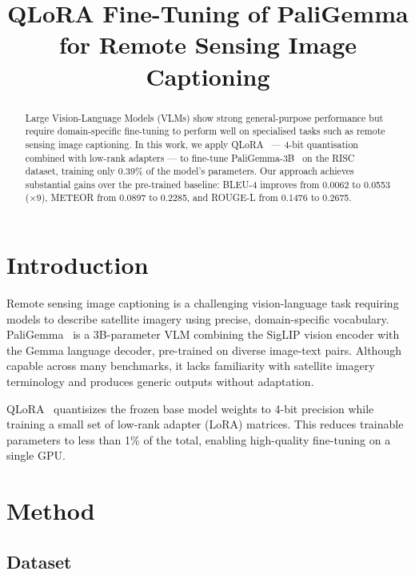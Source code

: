 \documentclass[conference]{IEEEtran}
\begin{document}
\title{QLoRA Fine-Tuning of PaliGemma for Remote Sensing Image Captioning}

\author{
}
\maketitle

\begin{abstract}
Large Vision-Language Models (VLMs) show strong general-purpose performance but require
domain-specific fine-tuning to perform well on specialised tasks such as remote sensing image captioning.
In this work, we apply QLoRA~\cite{dettmers2023qlora} --- 4-bit quantisation combined with
low-rank adapters --- to fine-tune PaliGemma-3B~\cite{beyer2024paligemma} on the RISC dataset,
training only 0.39\% of the model's parameters.
Our approach achieves substantial gains over the pre-trained baseline:
BLEU-4 improves from 0.0062 to 0.0553 ($\times$9), METEOR from 0.0897 to 0.2285,
and ROUGE-L from 0.1476 to 0.2675.
\end{abstract}

\section{Introduction}

Remote sensing image captioning is a challenging vision-language task requiring models to
describe satellite imagery using precise, domain-specific vocabulary.
PaliGemma~\cite{beyer2024paligemma} is a 3B-parameter VLM combining the SigLIP
vision encoder with the Gemma language decoder, pre-trained on diverse image-text pairs.
Although capable across many benchmarks, it lacks familiarity with satellite imagery terminology
and produces generic outputs without adaptation.

QLoRA~\cite{dettmers2023qlora} quantisizes the frozen base model weights
to 4-bit precision while training a small set of low-rank adapter (LoRA) matrices.
This reduces trainable parameters to less than 1\% of the total, enabling
high-quality fine-tuning on a single GPU.

\section{Method}

\subsection{Dataset}
\end{document}

